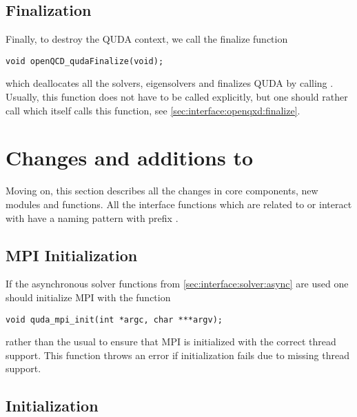 \subsection{Finalization}
\label{sec:interface:quda:finalize}


Finally, to destroy the QUDA context, we call the finalize function
\begin{verbatim}
void openQCD_qudaFinalize(void);
\end{verbatim}
which deallocates all the solvers, eigensolvers and finalizes QUDA by calling . Usually, this function does not have to be called explicitly, but one should rather call  which itself calls this function, see \cref{sec:interface:openqxd:finalize}.

\section{Changes and additions to \openqxd}
\label{sec:interface:openqxd}

Moving on, this section describes all the changes in \openqxd core components, new modules and functions.
All the interface functions which are related to or interact with \quda have a naming pattern with prefix .

\subsection{MPI Initialization}
\label{sec:interface:openqxd:mpi:init}


If the asynchronous solver functions from \cref{sec:interface:solver:async} are used one should initialize MPI with the function
\begin{verbatim}
void quda_mpi_init(int *argc, char ***argv);
\end{verbatim}
rather than the usual  to ensure that MPI is initialized with the correct thread support.
This function throws an error if initialization fails due to missing thread support.

\subsection{\Quda Initialization}
\label{sec:interface:openqxd:init}

